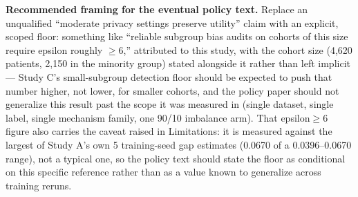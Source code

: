 \documentclass[11pt]{article}
\begin{document}
\textbf{Recommended framing for the eventual policy text.} Replace an unqualified ``moderate privacy settings preserve utility'' claim with an explicit, scoped floor: something like ``reliable subgroup bias audits on cohorts of this size require epsilon roughly $\geq$6,'' attributed to this study, with the cohort size (4,620 patients, 2,150 in the minority group) stated alongside it rather than left implicit --- Study C's small-subgroup detection floor should be expected to push that number higher, not lower, for smaller cohorts, and the policy paper should not generalize this result past the scope it was measured in (single dataset, single label, single mechanism family, one 90/10 imbalance arm). That epsilon$\geq$6 figure also carries the caveat raised in Limitations: it is measured against the largest of Study A's own 5 training-seed gap estimates (0.0670 of a 0.0396--0.0670 range), not a typical one, so the policy text should state the floor as conditional on this specific reference rather than as a value known to generalize across training reruns.
\end{document}
